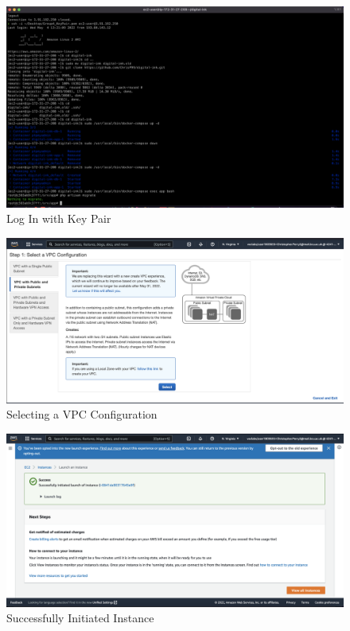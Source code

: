 \begin{figure}[H]
    \centering
        \includegraphics[width=\textwidth]{resources/log-in-with-key-pair.png}
    \caption{Log In with Key Pair}
    \label{fig:log-in-with-key-pair}
\end{figure}

\begin{figure}[H]
    \centering
        \includegraphics[width=\textwidth]{resources/selecting-a-vpc-configuration.png}
    \caption{Selecting a VPC Configuration}
    \label{fig:selecting-a-vpc-configuration}
\end{figure}

\begin{figure}[H]
    \centering
        \includegraphics[width=\textwidth]{resources/successfully-initiated-instance.png}
    \caption{Successfully Initiated Instance}
    \label{fig:successfully-initiated-instance}
\end{figure}

